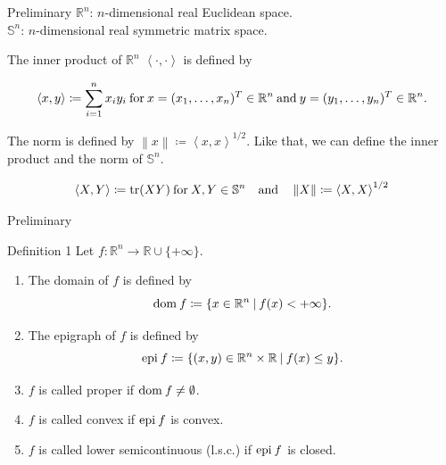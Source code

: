 \documentclass[aspectratio=169, dvipdfmx, 11pt]{beamer} %
\newcommand{\RealNumberSet}{\mathbb{R}}
\newcommand{\NDemenstionalRealEuclideanSpace}{\mathbb{R}^n}
\newcommand{\NDemenstionalRealSymmetricMatrixSpace}{\mathbb{S}^n}
\newcommand{\Domain}[1]{\text{\rm dom\:${#1}$}} %
\newcommand{\Epigraph}[1]{\text{\rm epi\:${#1}$}} %
\newcommand{\Trace}[1]{\text{\rm tr$({#1})$}} %
\newcommand{\InnerProduct}[2]{\left\langle {#1},{#2}\right\rangle} %
\newcommand{\ExtendedRealValuedFunction}[2]{{#1}: {#2} \to \RealNumberSet \cup \{+\infty\}}
\newcommand{\SetForm}[2]{
  \{{#1}\:|\:{#2}\}
}
\begin{document}
\begin{frame}{Preliminary}
$\NDemenstionalRealEuclideanSpace$: $n$-dimensional real Euclidean space. \\
$\NDemenstionalRealSymmetricMatrixSpace$: $n$-dimensional real symmetric matrix space.

The inner product of $\NDemenstionalRealEuclideanSpace$ $\left\langle \cdot ,\cdot \right\rangle$  is defined by

  \begin{equation}
    \InnerProduct{x}{y} \coloneqq \sum_{i = 1}^{n} x_i y_i \:\text{for}\: x=(x_1,\dots,x_n)^T \in \mathbb{R}^n \:\text{and}\: y=(y_1,\dots,y_n)^T \in \mathbb{R}^n. \notag
  \end{equation}

The norm is defined by $\left\lVert x \right\rVert \coloneqq \InnerProduct{x}{x} ^{1/2} $. Like that, we can define the inner product and the norm of $\NDemenstionalRealSymmetricMatrixSpace$.

  \begin{equation}
    \InnerProduct{X}{Y} \coloneqq \Trace{XY} \:\text{for}\: X,Y \in \NDemenstionalRealSymmetricMatrixSpace \quad \text{and} \quad \left\lVert X \right\rVert \coloneqq \InnerProduct{X}{X} ^{1/2} \notag
  \end{equation}
\end{frame}

\begin{frame}{Preliminary}
  \begin{block}{Definition 1}
    Let $\ExtendedRealValuedFunction{f}{\NDemenstionalRealEuclideanSpace}$.
    \begin{enumerate}
      \item The domain of $f$ is defined by
      \begin{equation}
        \Domain{f} \coloneqq \SetForm{x \in \NDemenstionalRealEuclideanSpace}{f(x) < +\infty}. \notag
      \end{equation}
      \item The epigraph of $f$ is defined by
      \begin{equation}
        \Epigraph{f} \coloneqq \SetForm{(x,y) \in \NDemenstionalRealEuclideanSpace \times \RealNumberSet}{f(x) \leq y}. \notag
      \end{equation}
      \item $f$ is called proper if $\Domain{f} \neq \emptyset$.
      \item $f$ is called convex if $\Epigraph{f}$ is convex.
      \item $f$ is called lower semicontinuous (l.s.c.) if $\Epigraph{f}$ is closed.
    \end{enumerate}
  \end{block}
\end{frame}
\end{document}
